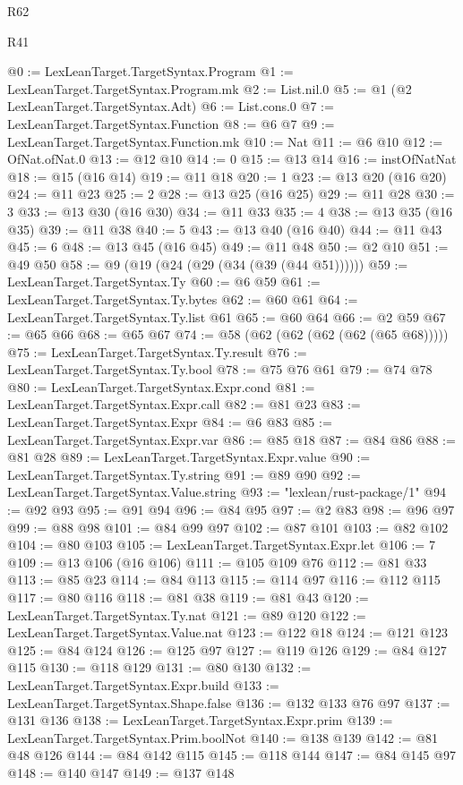 \begin{lexlean}{R62}
\begin{lexlean}{R41}
\begin{coremodule}
{{{{{{{{{{{{{{{{{{{{{{{{{{{{{{{{{{{{{{{{{{{{{{{{{{{{{{{{{{{{{{{{{{{{{{{{{{{{{{{{{{{{{{{@0 := LexLeanTarget.TargetSyntax.Program
@1 := LexLeanTarget.TargetSyntax.Program.mk
@2 := List.nil.{0}
@5 := @1 (@2 LexLeanTarget.TargetSyntax.Adt)
@6 := List.cons.{0}
@7 := LexLeanTarget.TargetSyntax.Function
@8 := @6 @7
@9 := LexLeanTarget.TargetSyntax.Function.mk
@10 := Nat
@11 := @6 @10
@12 := OfNat.ofNat.{0}
@13 := @12 @10
@14 := 0
@15 := @13 @14
@16 := instOfNatNat
@18 := @15 (@16 @14)
@19 := @11 @18
@20 := 1
@23 := @13 @20 (@16 @20)
@24 := @11 @23
@25 := 2
@28 := @13 @25 (@16 @25)
@29 := @11 @28
@30 := 3
@33 := @13 @30 (@16 @30)
@34 := @11 @33
@35 := 4
@38 := @13 @35 (@16 @35)
@39 := @11 @38
@40 := 5
@43 := @13 @40 (@16 @40)
@44 := @11 @43
@45 := 6
@48 := @13 @45 (@16 @45)
@49 := @11 @48
@50 := @2 @10
@51 := @49 @50
@58 := @9 (@19 (@24 (@29 (@34 (@39 (@44 @51))))))
@59 := LexLeanTarget.TargetSyntax.Ty
@60 := @6 @59
@61 := LexLeanTarget.TargetSyntax.Ty.bytes
@62 := @60 @61
@64 := LexLeanTarget.TargetSyntax.Ty.list @61
@65 := @60 @64
@66 := @2 @59
@67 := @65 @66
@68 := @65 @67
@74 := @58 (@62 (@62 (@62 (@62 (@65 @68)))))
@75 := LexLeanTarget.TargetSyntax.Ty.result
@76 := LexLeanTarget.TargetSyntax.Ty.bool
@78 := @75 @76 @61
@79 := @74 @78
@80 := LexLeanTarget.TargetSyntax.Expr.cond
@81 := LexLeanTarget.TargetSyntax.Expr.call
@82 := @81 @23
@83 := LexLeanTarget.TargetSyntax.Expr
@84 := @6 @83
@85 := LexLeanTarget.TargetSyntax.Expr.var
@86 := @85 @18
@87 := @84 @86
@88 := @81 @28
@89 := LexLeanTarget.TargetSyntax.Expr.value
@90 := LexLeanTarget.TargetSyntax.Ty.string
@91 := @89 @90
@92 := LexLeanTarget.TargetSyntax.Value.string
@93 := "lexlean/rust-package/1"
@94 := @92 @93
@95 := @91 @94
@96 := @84 @95
@97 := @2 @83
@98 := @96 @97
@99 := @88 @98
@101 := @84 @99 @97
@102 := @87 @101
@103 := @82 @102
@104 := @80 @103
@105 := LexLeanTarget.TargetSyntax.Expr.let
@106 := 7
@109 := @13 @106 (@16 @106)
@111 := @105 @109 @76
@112 := @81 @33
@113 := @85 @23
@114 := @84 @113
@115 := @114 @97
@116 := @112 @115
@117 := @80 @116
@118 := @81 @38
@119 := @81 @43
@120 := LexLeanTarget.TargetSyntax.Ty.nat
@121 := @89 @120
@122 := LexLeanTarget.TargetSyntax.Value.nat
@123 := @122 @18
@124 := @121 @123
@125 := @84 @124
@126 := @125 @97
@127 := @119 @126
@129 := @84 @127 @115
@130 := @118 @129
@131 := @80 @130
@132 := LexLeanTarget.TargetSyntax.Expr.build
@133 := LexLeanTarget.TargetSyntax.Shape.false
@136 := @132 @133 @76 @97
@137 := @131 @136
@138 := LexLeanTarget.TargetSyntax.Expr.prim
@139 := LexLeanTarget.TargetSyntax.Prim.boolNot
@140 := @138 @139
@142 := @81 @48 @126
@144 := @84 @142 @115
@145 := @118 @144
@147 := @84 @145 @97
@148 := @140 @147
@149 := @137 @148
}}}}}}}}}}}}}}}}}}}}}}}}}}}}}}}}}}}}}}}}}}}}}}}}}}}}}}}}}}}}}}}}}}}}}}}}}}}}}}}}}}}}}}}
\end{coremodule}
\end{lexlean}
\end{lexlean}
